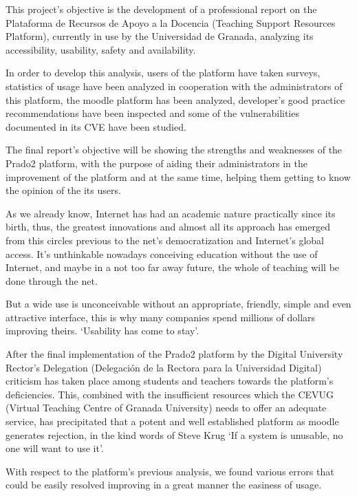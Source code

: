 {{This project’s objective is the development of a professional report on the Plataforma de Recursos de Apoyo a la Docencia (Teaching Support Resources Platform), currently in use by the Universidad de Granada, analyzing its accessibility, usability, safety and availability.

\bigskip
In order to develop this analysis, users of the platform have taken surveys, statistics of usage have been analyzed in cooperation with the administrators of this platform, the moodle platform has been analyzed, developer’s good practice recommendations have been inspected and some of the vulnerabilities documented in its CVE have been studied.

\bigskip
The final report’s objective will be showing the strengths and weaknesses of the Prado2 platform, with the purpose of aiding their administrators in the improvement of the platform and at the same time, helping them getting to know the opinion of the its users.

\bigskip
As we already know, Internet has had an academic nature practically since its birth, thus, the greatest innovations and almost all its approach has emerged from this circles previous to the net’s democratization and Internet’s global access.  It’s unthinkable nowadays conceiving education without the use of Internet, and maybe in a not too far away future, the whole of teaching will be done through the net.

\bigskip
But a wide use is unconceivable without an appropriate, friendly, simple and even attractive interface, this is why many companies spend millions of dollars improving theirs. ‘Usability has come to stay’.\cite{jakonielsen} 

\bigskip
After the final implementation of the Prado2 platform by the Digital University Rector’s Delegation (Delegación de la Rectora para la Universidad Digital) criticism has taken place among students and teachers towards the platform’s deficiencies. This, combined with the insufficient resources which the CEVUG (Virtual Teaching Centre of Granada University) needs to offer an adequate service, has precipitated that a potent and well established platform as moodle generates rejection, in the kind words of Steve Krug ‘If a system is unusable, no one will want to use it’\cite{stevekrug}.

\bigskip
With respect to the platform’s previous analysis, we found various errors that could be easily resolved improving in a great manner the easiness of usage.

}}
